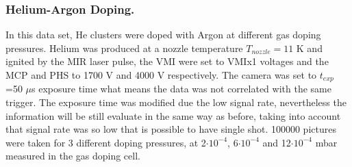 \subsubsection{Helium-Argon Doping.}

In this data set, He clusters were doped with Argon at different gas doping pressures. Helium was produced at a nozzle temperature $T_{nozzle}= 11$ K and ignited by the MIR laser pulse, the VMI were set to VMIx1 voltages and the MCP and PHS to 1700 V and 4000 V respectively. The camera was set to $t_{exp}$=50 $\mu$s exposure time what means the data was not correlated with the same trigger. The exposure time was modified due the low signal rate, nevertheless the information will be still evaluate in the same way  as before, taking into account that signal rate was so low that is possible to have single shot.  100000 pictures were taken for 3 different doping pressures, at 2$\cdot10^{-4}$, 6$\cdot10^{-4}$ and 12$\cdot10^{-4}$ mbar measured in the gas doping cell. 

